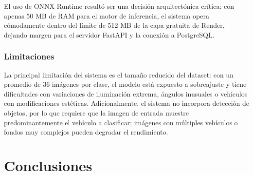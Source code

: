 \documentclass[12pt,a4paper]{article}
\begin{document}
El uso de ONNX Runtime resultó ser una decisión arquitectónica crítica: con apenas 50 MB de RAM para el motor de inferencia, el sistema opera cómodamente dentro del límite de 512 MB de la capa gratuita de Render, dejando margen para el servidor FastAPI y la conexión a PostgreSQL.

\subsubsection{Limitaciones}

La principal limitación del sistema es el tamaño reducido del dataset: con un promedio de 36 imágenes por clase, el modelo está expuesto a sobreajuste y tiene dificultades con variaciones de iluminación extrema, ángulos inusuales o vehículos con modificaciones estéticas. Adicionalmente, el sistema no incorpora detección de objetos, por lo que requiere que la imagen de entrada muestre predominantemente el vehículo a clasificar; imágenes con múltiples vehículos o fondos muy complejos pueden degradar el rendimiento.

\section{Conclusiones}
\end{document}
